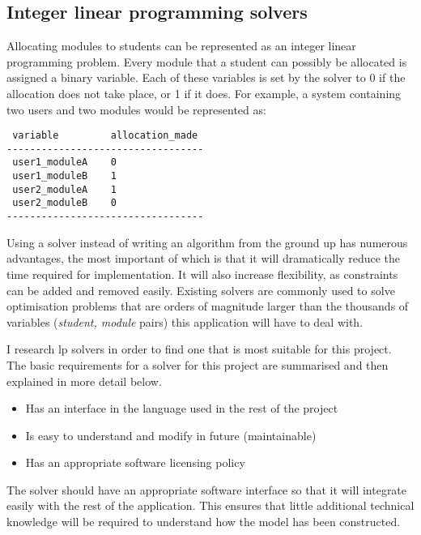 
\subsection{Integer linear programming solvers}
\label{sec:researchilp}


Allocating modules to students can be represented as an integer linear
programming problem. Every module that a student can possibly be allocated is
assigned a binary variable. Each of these variables is set by the solver to 0
if the allocation does not take place, or 1 if it does. For example, a system
containing two users and two modules would be represented as:

\begin{verbatim}
 variable         allocation_made
----------------------------------
 user1_moduleA    0
 user1_moduleB    1
 user2_moduleA    1
 user2_moduleB    0
----------------------------------
\end{verbatim}

Using a solver instead of writing an algorithm from the ground up has numerous
advantages, the most important of which is that it will dramatically reduce
the time required for implementation. It will also increase flexibility, as
constraints can be added and removed easily. Existing solvers are commonly
used to solve optimisation problems that are orders of magnitude larger than
the thousands of variables (\emph{student, module} pairs) this application
will have to deal with.

I research \gls{lp} solvers in order to find one that is most suitable for
this project. The basic requirements for a solver for this project are
summarised and then explained in more detail below.

\begin{itemize}
  \item Has an interface in the language used in the rest of the project
  \item Is easy to understand and modify in future (maintainable)
  \item Has an appropriate software licensing policy
\end{itemize}

The solver should have an appropriate software interface so that it will
integrate easily with the rest of the application. This ensures that little
additional technical knowledge will be required to understand how the model
has been constructed.

